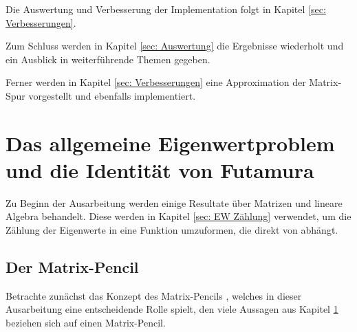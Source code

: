 \documentclass[a4paper,12pt]{report}
\newcommand{\zitat}[1]{\glqq #1\grqq}
\newcommand{\1}{\mathds{1}}
\theoremstyle{plain} %
\theoremstyle{definition} %
\theoremstyle{remark}
\begin{document}

      Die Auswertung und Verbesserung der Implementation folgt in Kapitel \ref{sec: Verbesserungen}.



      Zum Schluss werden in Kapitel \ref{sec: Auswertung} die Ergebnisse wiederholt und ein Ausblick in weiterführende Themen gegeben.

      Ferner werden in Kapitel \ref{sec: Verbesserungen} eine Approximation der Matrix-Spur vorgestellt und ebenfalls implementiert.

\chapter{Das allgemeine Eigenwertproblem und die Identität von Futamura}
\label{sec: EW Problem_Futamura}

      Zu Beginn der Ausarbeitung werden einige Resultate über Matrizen und lineare Algebra behandelt.
      Diese werden in Kapitel \ref{sec: EW Zählung} verwendet, um die Zählung der Eigenwerte in eine Funktion \J umzuformen, die direkt von \s abhängt.
      
      \section{Der Matrix-Pencil}
            Betrachte zunächst das Konzept des \zitat{Matrix-Pencils} \cite[S. 32]{matrixPencilDeutsch}, welches in dieser Ausarbeitung eine entscheidende Rolle spielt, den viele Aussagen aus Kapitel \ref{sec: EW Problem_Futamura} beziehen sich auf einen Matrix-Pencil.
      
\end{document}

